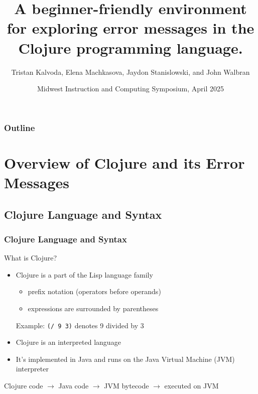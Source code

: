\documentclass{beamer}
\newcommand{\comment}[1]{{\bf \tt  {#1}}}
\newcommand{\emcomment}[1]{\textcolor{ForestGreen}{\comment{Elena: {#1}}}}
\begin{document}
\title{A beginner-friendly environment for exploring error messages in the Clojure programming language.}
\author{Tristan Kalvoda, Elena Machkasova, Jaydon Stanislowski, and John Walbran}
\date[]  
{Midwest Instruction and Computing Symposium, April 2025}

\begin{frame}
  \titlepage
\end{frame}

\begin{frame}

  \frametitle{Outline}
\tableofcontents
\end{frame}

\section{Overview of Clojure and its Error Messages}

\subsection{Clojure Language and Syntax}
\begin{frame}
\frametitle{Clojure Language and Syntax}
What is Clojure? %
\begin{itemize}
  \item Clojure is a part of the Lisp language family
  \begin{itemize}
    \item prefix notation (operators before operands)
    \item expressions are surrounded by parentheses
  \end{itemize}
  Example: \texttt{(/ 9 3)} denotes 9 divided by 3
  \item Clojure is an interpreted language
  \item It's implemented in Java and runs on the Java Virtual Machine (JVM) interpreter
\end{itemize}
  Clojure code \(\rightarrow\) Java code \(\rightarrow\) JVM bytecode \(\rightarrow\)  executed on JVM
\end{frame}

\end{document}

